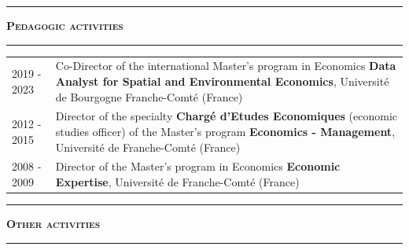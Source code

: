 \documentclass[a4paper,12pt]{article}
\newcommand{\titre}[1]{%
	\bigskip
	\noindent \rule[2mm]{\textwidth}{0.5pt}
	\textbf{\textsc{\large #1}} \\
	\noindent \rule[1mm]{\textwidth}{0.5pt}
	}
\begin{document}
\titre{Pedagogic activities}

\noindent \begin{longtable}{@{}p{\annee}p{\texte}@{}}
2019 - 2023 & Co-Director of the international Master's program in Economics \og{}\textbf{Data Analyst for Spatial and Environmental Economics}\fg{}, Université de Bourgogne Franche-Comté (France) \\
2012 - 2015	& Director of the specialty \og{}\textbf{Chargé d'Etudes Economiques}\fg{} (economic studies officer) of the Master's program \og{}\textbf{Economics - Management}\fg{}, Université de Franche-Comté (France) \\
2008 - 2009	& Director of the Master's program in Economics \og{}\textbf{Economic Expertise}\fg{}, Université de Franche-Comté (France)
\end{longtable}


\titre{Other activities}
\end{document}
